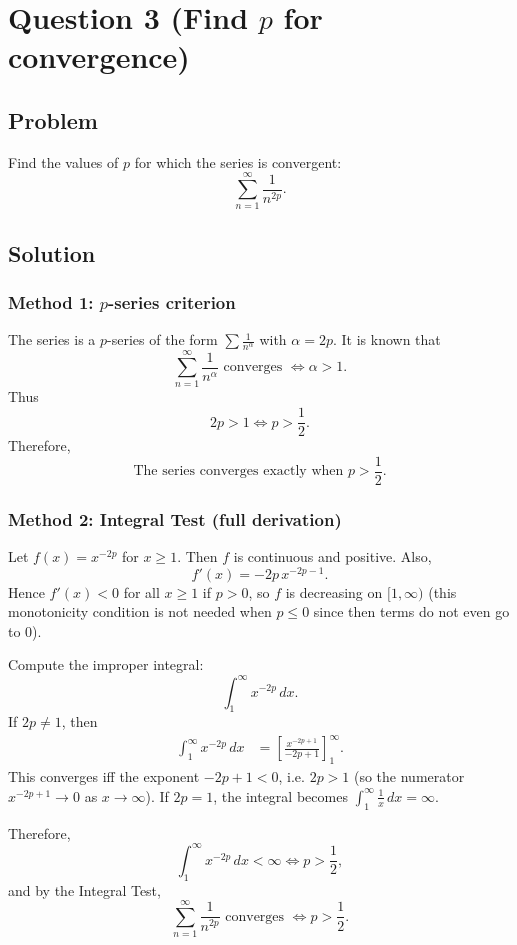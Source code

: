 \documentclass[12pt]{article}
\begin{document}
\newpage
\section*{Question 3 (Find \(p\) for convergence)}
\subsection*{Problem}
Find the values of \(p\) for which the series is convergent:
\[
\sum_{n=1}^{\infty}\frac{1}{n^{2p}}.
\]

\subsection*{Solution}

\subsubsection*{Method 1: \(p\)-series criterion}
The series is a \(p\)-series of the form \(\sum \frac{1}{n^\alpha}\) with \(\alpha=2p\).
It is known that
\[
\sum_{n=1}^{\infty}\frac{1}{n^\alpha}
\text{ converges } \Longleftrightarrow \alpha>1.
\]
Thus
\[
2p>1 \Longleftrightarrow p>\frac12.
\]
Therefore,
\[
\boxed{\text{The series converges exactly when }p>\frac12.}
\]

\subsubsection*{Method 2: Integral Test (full derivation)}
Let \(f(x)=x^{-2p}\) for \(x\ge 1\). Then \(f\) is continuous and positive. Also,
\[
f'(x)=-2p\,x^{-2p-1}.
\]
Hence \(f'(x)<0\) for all \(x\ge 1\) if \(p>0\), so \(f\) is decreasing on \([1,\infty)\) (this monotonicity condition is not needed when \(p\le 0\) since then terms do not even go to \(0\)).

Compute the improper integral:
\[
\int_1^\infty x^{-2p}\,dx.
\]
If \(2p\neq 1\), then
\begin{align*}
\int_1^\infty x^{-2p}\,dx
&=\left[\frac{x^{-2p+1}}{-2p+1}\right]_{1}^{\infty}.
\end{align*}
This converges iff the exponent \(-2p+1<0\), i.e. \(2p>1\) (so the numerator \(x^{-2p+1}\to 0\) as \(x\to\infty\)).
If \(2p=1\), the integral becomes \(\int_1^\infty \frac{1}{x}\,dx=\infty\).

Therefore,
\[
\int_1^\infty x^{-2p}\,dx<\infty \Longleftrightarrow p>\frac12,
\]
and by the Integral Test,
\[
\boxed{\sum_{n=1}^{\infty}\frac{1}{n^{2p}} \text{ converges } \Longleftrightarrow p>\frac12.}
\]
\end{document}
